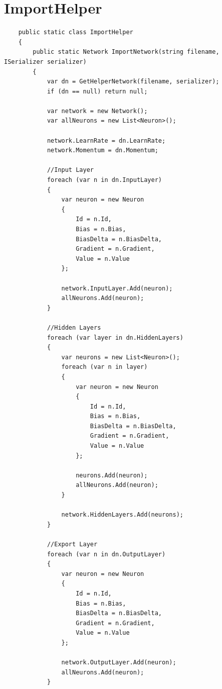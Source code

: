 \documentclass[12pt,a4paper]{article}
\begin{document}
	\section*{ImportHelper}
	\begin{lstlisting}
	public static class ImportHelper
	{
        public static Network ImportNetwork(string filename, ISerializer serializer)
        {
            var dn = GetHelperNetwork(filename, serializer);
            if (dn == null) return null;

            var network = new Network();
            var allNeurons = new List<Neuron>();

            network.LearnRate = dn.LearnRate;
            network.Momentum = dn.Momentum;

            //Input Layer
            foreach (var n in dn.InputLayer)
            {
                var neuron = new Neuron
                {
                    Id = n.Id,
                    Bias = n.Bias,
                    BiasDelta = n.BiasDelta,
                    Gradient = n.Gradient,
                    Value = n.Value
                };

                network.InputLayer.Add(neuron);
                allNeurons.Add(neuron);
            }

            //Hidden Layers
            foreach (var layer in dn.HiddenLayers)
            {
                var neurons = new List<Neuron>();
                foreach (var n in layer)
                {
                    var neuron = new Neuron
                    {
                        Id = n.Id,
                        Bias = n.Bias,
                        BiasDelta = n.BiasDelta,
                        Gradient = n.Gradient,
                        Value = n.Value
                    };

                    neurons.Add(neuron);
                    allNeurons.Add(neuron);
                }

                network.HiddenLayers.Add(neurons);
            }

            //Export Layer
            foreach (var n in dn.OutputLayer)
            {
                var neuron = new Neuron
                {
                    Id = n.Id,
                    Bias = n.Bias,
                    BiasDelta = n.BiasDelta,
                    Gradient = n.Gradient,
                    Value = n.Value
                };

                network.OutputLayer.Add(neuron);
                allNeurons.Add(neuron);
            }


\end{lstlisting}
\end{document}
